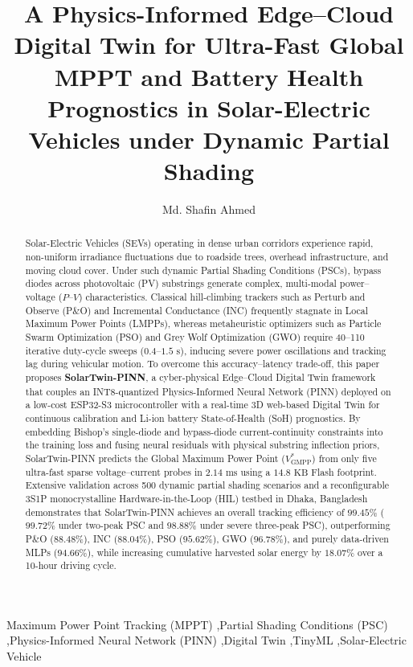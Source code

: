 \documentclass[final,3p,times,twocolumn]{elsarticle}
\begin{document}
\begin{frontmatter}

\title{A Physics-Informed Edge--Cloud Digital Twin for Ultra-Fast Global MPPT and Battery Health Prognostics in Solar-Electric Vehicles under Dynamic Partial Shading}

\author[du]{Md. Shafin Ahmed}

\address[du]{Department of Robotics and Mechatronics Engineering, University of Dhaka, Dhaka 1000, Bangladesh}

\begin{abstract}
Solar-Electric Vehicles (SEVs) operating in dense urban corridors experience rapid, non-uniform irradiance fluctuations due to roadside trees, overhead infrastructure, and moving cloud cover. Under such dynamic Partial Shading Conditions (PSCs), bypass diodes across photovoltaic (PV) substrings generate complex, multi-modal power--voltage ($P\text{--}V$) characteristics. Classical hill-climbing trackers such as Perturb and Observe (P\&O) and Incremental Conductance (INC) frequently stagnate in Local Maximum Power Points (LMPPs), whereas metaheuristic optimizers such as Particle Swarm Optimization (PSO) and Grey Wolf Optimization (GWO) require 40--110 iterative duty-cycle sweeps ($0.4\text{--}1.5\text{ s}$), inducing severe power oscillations and tracking lag during vehicular motion. To overcome this accuracy--latency trade-off, this paper proposes \textbf{SolarTwin-PINN}, a cyber-physical Edge--Cloud Digital Twin framework that couples an INT8-quantized Physics-Informed Neural Network (PINN) deployed on a low-cost ESP32-S3 microcontroller with a real-time 3D web-based Digital Twin for continuous calibration and Li-ion battery State-of-Health (SoH) prognostics. By embedding Bishop's single-diode and bypass-diode current-continuity constraints into the training loss and fusing neural residuals with physical substring inflection priors, SolarTwin-PINN predicts the Global Maximum Power Point ($V_{\text{GMPP}}^*$) from only five ultra-fast sparse voltage--current probes in $2.14\text{ ms}$ using a $14.8\text{ KB}$ Flash footprint. Extensive validation across 500 dynamic partial shading scenarios and a reconfigurable 3S1P monocrystalline Hardware-in-the-Loop (HIL) testbed in Dhaka, Bangladesh demonstrates that SolarTwin-PINN achieves an overall tracking efficiency of $99.45\%$ ($99.72\%$ under two-peak PSC and $98.88\%$ under severe three-peak PSC), outperforming P\&O ($88.48\%$), INC ($88.04\%$), PSO ($95.62\%$), GWO ($96.78\%$), and purely data-driven MLPs ($94.66\%$), while increasing cumulative harvested solar energy by $18.07\%$ over a 10-hour driving cycle.
\end{abstract}

\begin{keyword}
Maximum Power Point Tracking (MPPT) \sep Partial Shading Conditions (PSC) \sep Physics-Informed Neural Network (PINN) \sep Digital Twin \sep TinyML \sep Solar-Electric Vehicle
\end{keyword}

\end{frontmatter}
\end{document}
